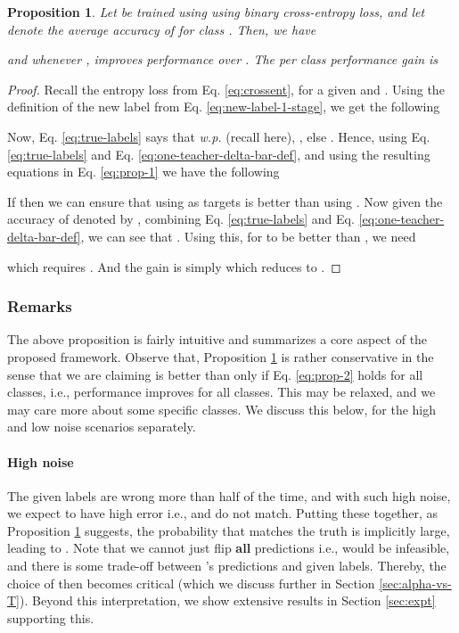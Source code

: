 \documentclass{article}
\newtheorem{proposition}{Proposition}
\begin{document}
 
\begin{proposition} \label{prop:delta-bar}
  Let  be trained using  using binary cross-entropy loss, and let  denote the average accuracy of  for class .
  Then, we have
  
  and whenever ,  improves performance over . The per class performance gain is  
\end{proposition}
\begin{proof}
Recall the entropy loss from Eq. \ref{eq:crossent}, for a given  and . 
Using the definition of the new label from Eq. \ref{eq:new-label-1-stage}, we get the following 

Now, Eq. \ref{eq:true-labels} says that {\it w.p.}  (recall  here), , else . 
Hence, using Eq. \ref{eq:true-labels} and Eq. \ref{eq:one-teacher-delta-bar-def}, and using the resulting equations in Eq. \ref{eq:prop-1} we have the following

If  then we can ensure that using  as targets is better than using . 
Now given the accuracy of  denoted by , combining Eq. \ref{eq:true-labels} and Eq. \ref{eq:one-teacher-delta-bar-def}, we can see that . Using this, for  to be better than ,  we need

which requires . And the gain is simply  which reduces to . 
\end{proof}

\subsubsection{Remarks} \label{sec:remarks}

The above proposition is fairly intuitive and summarizes a core aspect of the proposed framework. 
Observe that, Proposition \ref{prop:delta-bar} is rather conservative in the sense that we are claiming  is better than  only if Eq. \ref{eq:prop-2} holds for all classes, 
i.e., performance improves for all classes. 
This may be relaxed, and we may care more about some specific classes. 
We discuss this below, for the high and low noise scenarios separately. 

\noindent \paragraph{High noise } \label{sec:high-noise}
The given labels  are wrong more than half of the time, 
and with such high noise, we expect  to have high error i.e.,  and  do not match.
Putting these together, as Proposition \ref{prop:delta-bar} suggests, 
the probability that  matches the truth  is implicitly large, 
leading to . 
Note that we cannot just flip {\bf all} predictions i.e.,  would be infeasible, 
and there is some trade-off between 's predictions and given labels. 
Thereby, the choice of  then becomes critical (which we discuss further in Section \ref{sec:alpha-vs-T}).
Beyond this interpretation, we show extensive results in Section \ref{sec:expt} supporting this. 
\end{document}
